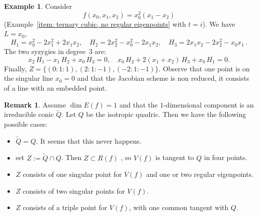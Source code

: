 \documentclass[11pt, a4paper, reqno, captions=tableheading,bibliography=totoc]{scrartcl}
\theoremstyle{plain}
\theoremstyle{definition}
\newtheorem{es}[lemma]{Example}
\newtheorem{rmk}[lemma]{Remark}
\begin{document}
\begin{es}
Consider
\[
f(x_0,x_1,x_2)=x_0^2 (x_1 - x_2)
\]
(Example~\eqref{item: ternary cubic, no regular eigenpoints} with $t=i$).
We have $L=x_0$,
\[
H_1=x_0^2-2x_1^2+2x_1 x_2, \quad H_2= 2x_2^2-x_0^2-2x_1 x_2, \quad H_3= 2x_1x_2-2x_2^2-x_0x_1 \,.
\]
The two syzygies in degree~$3$ are:
\[
x_2 \, H_1 - x_1 \, H_2 + x_0 \, H_3 = 0, \quad x_0 \, H_2 + 2(x_1+x_2) \, H_3 + x_0 \, H_1 = 0.
\]
Finally, $Z= \{ (0:1:1),(2:1:-1),(-2:1:-1)\}$. Observe that one point is on the singular line $x_0=0$
and that the Jacobian scheme is non reduced, it consists of a line with an embedded point.
\end{es}

\begin{rmk}
Assume $\dim E(f) =1$ and that the $1$-dimensional component is an irreducible conic $\tilde Q$. Let $Q$ be the isotropic quadric. Then we have the following possible cases:
\begin{itemize}
\item $\tilde Q = Q$. It seems that this never happens.
\item set $Z:= \tilde Q \cap Q$. Then $Z\subset R(f)$ , so $V(f)$ is tangent to $Q$ in four points.
\item $Z$ consists of one singular point for $V(f)$ and one or two regular eigenpoints.
\item $Z$ consists of two singular points for $V(f)$.
\item $Z$ consists of a triple point for $V(f)$, with one common tangent with $Q$.
\end{itemize}
\end{rmk}



\end{document}
